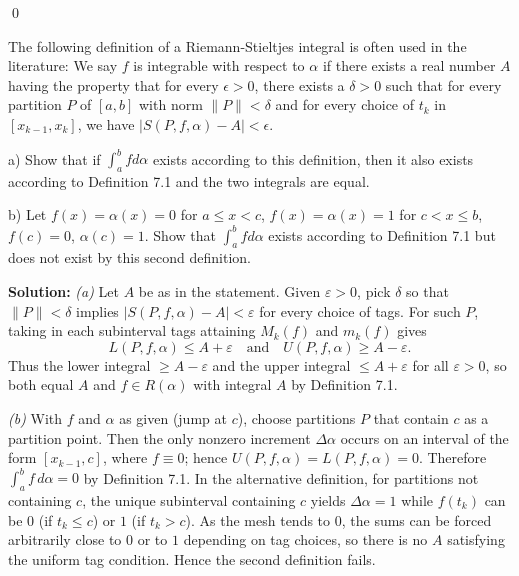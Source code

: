 \qed
\begin{problembox}
The following definition of a Riemann-Stieltjes integral is often used in the literature: We say $f$ is integrable with respect to $\alpha$ if there exists a real number $A$ having the property that for every $\epsilon > 0$, there exists a $\delta > 0$ such that for every partition $P$ of $[a, b]$ with norm $\|P\| < \delta$ and for every choice of $t_k$ in $[x_{k-1}, x_k]$, we have $|S(P, f, \alpha) - A| < \epsilon$.

a) Show that if $\int_a^b f d\alpha$ exists according to this definition, then it also exists according to Definition 7.1 and the two integrals are equal.

b) Let $f(x) = \alpha(x) = 0$ for $a \leq x < c$, $f(x) = \alpha(x) = 1$ for $c < x \leq b$, $f(c) = 0$, $\alpha(c) = 1$. Show that $\int_a^b f d\alpha$ exists according to Definition 7.1 but does not exist by this second definition.
\end{problembox}

\noindent\textbf{Solution:}
\textit{(a)} Let $A$ be as in the statement. Given $\varepsilon>0$, pick $\delta$ so that $\|P\|<\delta$ implies $|S(P,f,\alpha)-A|<\varepsilon$ for every choice of tags. For such $P$, taking in each subinterval tags attaining $M_k(f)$ and $m_k(f)$ gives
\[L(P,f,\alpha)\le A+\varepsilon\quad\text{and}\quad U(P,f,\alpha)\ge A-\varepsilon.
\]
Thus the lower integral $\ge A-\varepsilon$ and the upper integral $\le A+\varepsilon$ for all $\varepsilon>0$, so both equal $A$ and $f\in R(\alpha)$ with integral $A$ by Definition 7.1.

\textit{(b)} With $f$ and $\alpha$ as given (jump at $c$), choose partitions $P$ that contain $c$ as a partition point. Then the only nonzero increment $\Delta\alpha$ occurs on an interval of the form $[x_{k-1},c]$, where $f\equiv 0$; hence $U(P,f,\alpha)=L(P,f,\alpha)=0$. Therefore $\int_a^b f\,d\alpha=0$ by Definition 7.1. In the alternative definition, for partitions not containing $c$, the unique subinterval containing $c$ yields $\Delta\alpha=1$ while $f(t_k)$ can be $0$ (if $t_k\le c$) or $1$ (if $t_k>c$). As the mesh tends to $0$, the sums can be forced arbitrarily close to $0$ or to $1$ depending on tag choices, so there is no $A$ satisfying the uniform tag condition. Hence the second definition fails.




